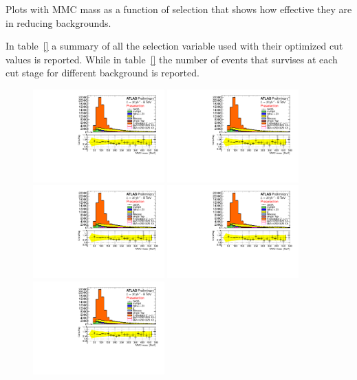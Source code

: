 Plots with MMC mass as a function of selection that shows how effective they are in reducing backgrounds.

In table~\ref{} a summary of all the selection variable used with their optimized cut values is reported.
While in table~\ref{} the number of events that survises at each cut stage for different background is reported.

\begin{figure}[htp]
     \begin{center}

            \includegraphics[page=1,width=0.45\textwidth]{figure/std_plots_presel.pdf}
            \includegraphics[page=2,width=0.45\textwidth]{figure/std_plots_presel.pdf}
            \includegraphics[page=3,width=0.45\textwidth]{figure/std_plots_presel.pdf}
            \includegraphics[page=4,width=0.45\textwidth]{figure/std_plots_presel.pdf}
            \includegraphics[page=5,width=0.45\textwidth]{figure/std_plots_presel.pdf}


\end{center}
\end{figure}
